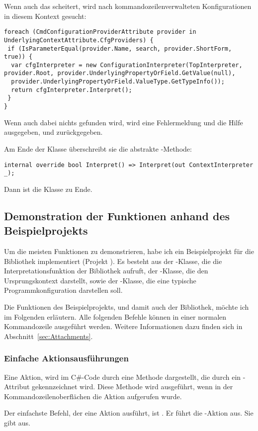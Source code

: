 Wenn auch das scheitert, wird nach kommandozeilenverwalteten Konfigurationen in diesem Kontext gesucht:
\begin{lstlisting}[title=""]
foreach (CmdConfigurationProviderAttribute provider in UnderlyingContextAttribute.CfgProviders) {
 if (IsParameterEqual(provider.Name, search, provider.ShortForm, true)) {
  var cfgInterpreter = new ConfigurationInterpreter(TopInterpreter, provider.Root, provider.UnderlyingPropertyOrField.GetValue(null),
  provider.UnderlyingPropertyOrField.ValueType.GetTypeInfo());
  return cfgInterpreter.Interpret();
 }
}
\end{lstlisting}
Wenn auch dabei nichts gefunden wird, wird eine Fehlermeldung und die Hilfe ausgegeben, und  zurückgegeben.

Am Ende der Klasse überschreibt sie die abstrakte -Methode:
\begin{lstlisting}[title=""]
 internal override bool Interpret() => Interpret(out ContextInterpreter _);
\end{lstlisting}
Dann ist die Klasse zu Ende.
\subsection{Demonstration der Funktionen anhand des Beispielprojekts}\label{subsec:demonstration}
Um die meisten Funktionen zu demonstrieren, habe ich ein Beispielprojekt für die Bibliothek implementiert (Projekt ).
Es besteht aus der -Klasse, die die Interpretationsfunktion der Bibliothek aufruft, der -Klasse, 
die den Ursprungskontext darstellt, sowie der -Klasse, die eine typische Programmkonfiguration darstellen soll.

Die Funktionen des Beispielprojekts, und damit auch der Bibliothek, möchte ich im Folgenden erläutern.
Alle folgenden Befehle können in einer normalen Kommandozeile ausgeführt werden.
Weitere Informationen dazu finden sich in Abschnitt~\ref{sec:Attachments}.%
\subsubsection{Einfache Aktionsausführungen}
Eine Aktion, wird im C\#-Code durch eine Methode dargestellt, die durch ein -Attribut gekennzeichnet wird.
Diese Methode wird ausgeführt, wenn in der Kommandozeilenoberflächen die Aktion aufgerufen wurde.

Der einfachste Befehl, der eine Aktion ausführt, ist .
Er führt die -Aktion aus.
Sie gibt  aus.

